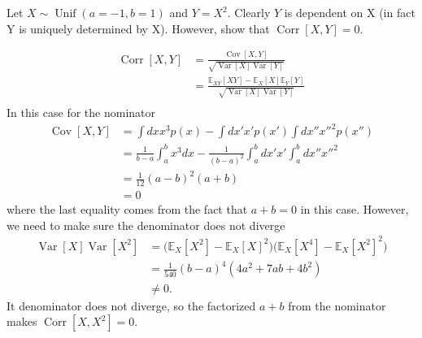 \newpage
\begin{example}
	Let $X\sim \operatorname{Unif}(a=-1, b=1)$ and $Y=X^2$. Clearly $Y$ is dependent on X (in fact Y is uniquely determined by X). However, show that $\operatorname{Corr}[X,Y]=0$.
	
	\begin{equation}
		\begin{split}
			\operatorname{Corr}[X,Y] & = \frac{\operatorname{Cov}[X,Y]}{\sqrt{\operatorname{Var}[X]\operatorname{Var}[Y]}}\\
			& = \frac{\mathbb{E}_{XY}[XY]-\mathbb{E}_X[X]\mathbb{E}_Y[Y]}{\sqrt{\operatorname{Var}[X]\operatorname{Var}[Y]}}\\
		\end{split}
	\end{equation}
	In this case for the nominator
	\begin{equation}
		\begin{split}
			\operatorname{Cov}[X,Y] &= \int dx x^3 p(x)-\int dx' x'p(x')\int dx'' x''^2p(x'')\\
			&= \frac{1}{b-a}\int_{a}^{b}x^3dx-\frac{1}{(b-a)^2}\int_{a}^{b}dx' x'\int_{a}^{b}dx'' x''^2\\
			&= \frac{1}{12}(a-b)^2(a+b)\\
			&=0
		\end{split}
	\end{equation}
	where the last equality comes from the fact that $a+b = 0$ in this case. However, we need to make sure the denominator does not diverge
	\begin{equation}
		\begin{split}
			\operatorname{Var}[X]\operatorname{Var}[X^2] & =\big(\mathbb{E}_X[X^2]-\mathbb{E}_X[X]^2\big) \big(\mathbb{E}_X[X^4]-\mathbb{E}_X[X^2]^2\big)\\
			& = \frac{1}{540}(b-a)^4(4a^2+7ab+4b^2)\\
			&\neq 0.
		\end{split}
	\end{equation}
	It denominator does not diverge, so the factorized $a+b$ from the nominator makes $\operatorname{Corr}[X,X^2]=0$.
\end{example}

